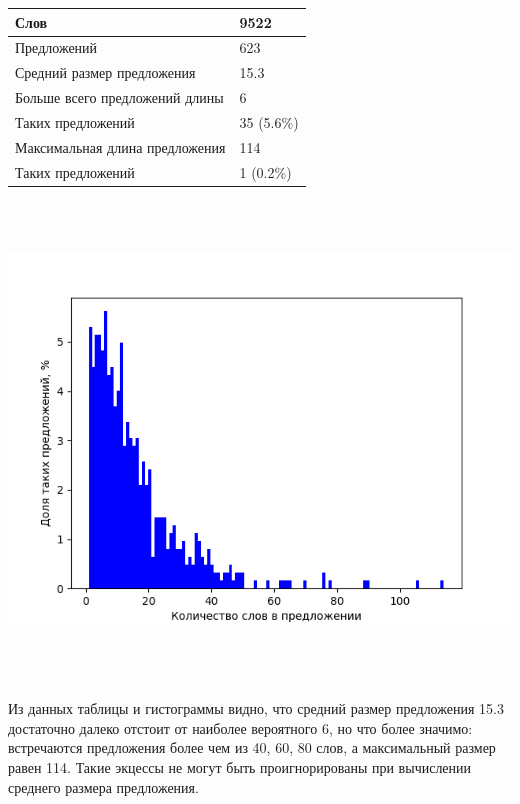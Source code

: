 \documentclass{kursa4}
\begin{document}
    \begin{center}
    \tablehead{}
    \begin{supertabular}{|m{5.7730002cm}|m{1.6559999cm}|}
    \hline
    Слов &
    9522\\\hline
    Предложений &
    623\\\hline
    Средний размер предложения &
    15.3\\\hline
    Больше всего предложений длины &
    6\\\hline
    Таких предложений &
    35 (5.6\%)\\\hline
    Максимальная длина предложения &
    114\\\hline
    Таких предложений &
    1 (0.2\%)\\\hline
    \end{supertabular}
    \end{center}
    {}
    \includegraphics[width=16.933cm,height=12.7cm]{irmw2lnohyper-img2.png} 

    {Из данных таблицы и гистограммы видно, что средний
    размер предложения 15.3 достаточно далеко отстоит от наиболее
    вероятного 6, но что более значимо: встречаются предложения более чем
    из 40, 60, 80 слов, а максимальный размер равен 114. Такие экцессы не
    могут быть проигнорированы при вычислении среднего размера предложения.
    }
\end{document}
